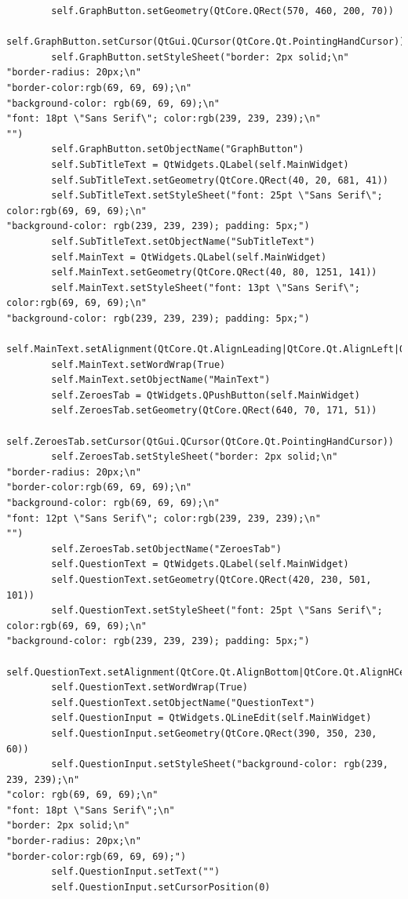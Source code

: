 \documentclass{article}
\begin{document}
\begin{lstlisting}
        self.GraphButton.setGeometry(QtCore.QRect(570, 460, 200, 70))
        self.GraphButton.setCursor(QtGui.QCursor(QtCore.Qt.PointingHandCursor))
        self.GraphButton.setStyleSheet("border: 2px solid;\n"
"border-radius: 20px;\n"
"border-color:rgb(69, 69, 69);\n"
"background-color: rgb(69, 69, 69);\n"
"font: 18pt \"Sans Serif\"; color:rgb(239, 239, 239);\n"
"")
        self.GraphButton.setObjectName("GraphButton")
        self.SubTitleText = QtWidgets.QLabel(self.MainWidget)
        self.SubTitleText.setGeometry(QtCore.QRect(40, 20, 681, 41))
        self.SubTitleText.setStyleSheet("font: 25pt \"Sans Serif\"; color:rgb(69, 69, 69);\n"
"background-color: rgb(239, 239, 239); padding: 5px;")
        self.SubTitleText.setObjectName("SubTitleText")
        self.MainText = QtWidgets.QLabel(self.MainWidget)
        self.MainText.setGeometry(QtCore.QRect(40, 80, 1251, 141))
        self.MainText.setStyleSheet("font: 13pt \"Sans Serif\"; color:rgb(69, 69, 69);\n"
"background-color: rgb(239, 239, 239); padding: 5px;")
        self.MainText.setAlignment(QtCore.Qt.AlignLeading|QtCore.Qt.AlignLeft|QtCore.Qt.AlignTop)
        self.MainText.setWordWrap(True)
        self.MainText.setObjectName("MainText")
        self.ZeroesTab = QtWidgets.QPushButton(self.MainWidget)
        self.ZeroesTab.setGeometry(QtCore.QRect(640, 70, 171, 51))
        self.ZeroesTab.setCursor(QtGui.QCursor(QtCore.Qt.PointingHandCursor))
        self.ZeroesTab.setStyleSheet("border: 2px solid;\n"
"border-radius: 20px;\n"
"border-color:rgb(69, 69, 69);\n"
"background-color: rgb(69, 69, 69);\n"
"font: 12pt \"Sans Serif\"; color:rgb(239, 239, 239);\n"
"")
        self.ZeroesTab.setObjectName("ZeroesTab")
        self.QuestionText = QtWidgets.QLabel(self.MainWidget)
        self.QuestionText.setGeometry(QtCore.QRect(420, 230, 501, 101))
        self.QuestionText.setStyleSheet("font: 25pt \"Sans Serif\"; color:rgb(69, 69, 69);\n"
"background-color: rgb(239, 239, 239); padding: 5px;")
        self.QuestionText.setAlignment(QtCore.Qt.AlignBottom|QtCore.Qt.AlignHCenter)
        self.QuestionText.setWordWrap(True)
        self.QuestionText.setObjectName("QuestionText")
        self.QuestionInput = QtWidgets.QLineEdit(self.MainWidget)
        self.QuestionInput.setGeometry(QtCore.QRect(390, 350, 230, 60))
        self.QuestionInput.setStyleSheet("background-color: rgb(239, 239, 239);\n"
"color: rgb(69, 69, 69);\n"
"font: 18pt \"Sans Serif\";\n"
"border: 2px solid;\n"
"border-radius: 20px;\n"
"border-color:rgb(69, 69, 69);")
        self.QuestionInput.setText("")
        self.QuestionInput.setCursorPosition(0)

\end{lstlisting}
\end{document}
